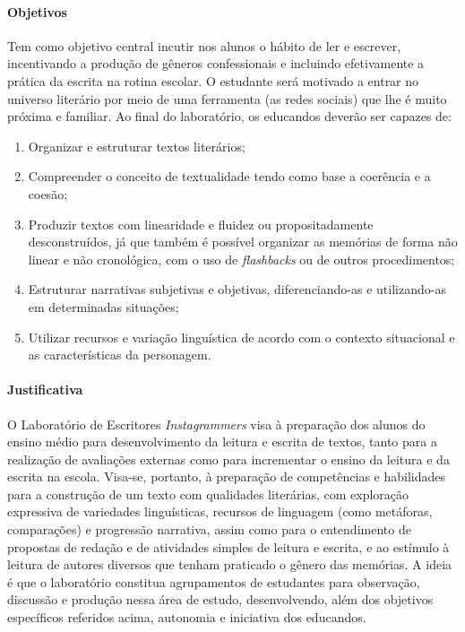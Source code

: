 \documentclass{article}
\begin{document}
\paragraph{Objetivos}

Tem como objetivo central incutir nos alunos o hábito de ler e escrever,
incentivando a produção de gêneros confessionais e incluindo
efetivamente a prática da escrita na rotina escolar. O estudante será
motivado a entrar no universo literário por meio de uma ferramenta (as
redes sociais) que lhe é muito próxima e familiar. Ao final do
laboratório, os educandos deverão ser capazes de:

\begin{enumerate}
\item
Organizar e estruturar textos literários;

\item
Compreender o conceito de textualidade tendo como base a coerência e a
coesão;

\item
Produzir textos com linearidade e fluidez ou propositadamente
desconstruídos, já que também é possível organizar as memórias de forma
não linear e não cronológica, com o uso de \emph{flashbacks} ou de
outros procedimentos;

\item
Estruturar narrativas subjetivas e objetivas, diferenciando-as e
utilizando-as em determinadas situações;

\item
Utilizar recursos e variação linguística de acordo com o contexto
situacional e as características da personagem.
\end{enumerate}

\paragraph{Justificativa}
O Laboratório de Escritores \emph{Instagrammers} visa à preparação dos
alunos do ensino médio para desenvolvimento da leitura e escrita de
textos, tanto para a realização de avaliações externas como para
incrementar o ensino da leitura e da escrita na escola. Visa-se,
portanto, à preparação de competências e habilidades para a construção
de um texto com qualidades literárias, com exploração expressiva de
variedades linguísticas, recursos de linguagem (como metáforas,
comparações) e progressão narrativa, assim como para o entendimento de
propostas de redação e de atividades simples de leitura e escrita, e ao
estímulo à leitura de autores diversos que tenham praticado o gênero das
memórias. A ideia é que o laboratório constitua agrupamentos de
estudantes para observação, discussão e produção nessa área de estudo,
desenvolvendo, além dos objetivos específicos referidos acima, autonomia
e iniciativa dos educandos.
\end{document}
